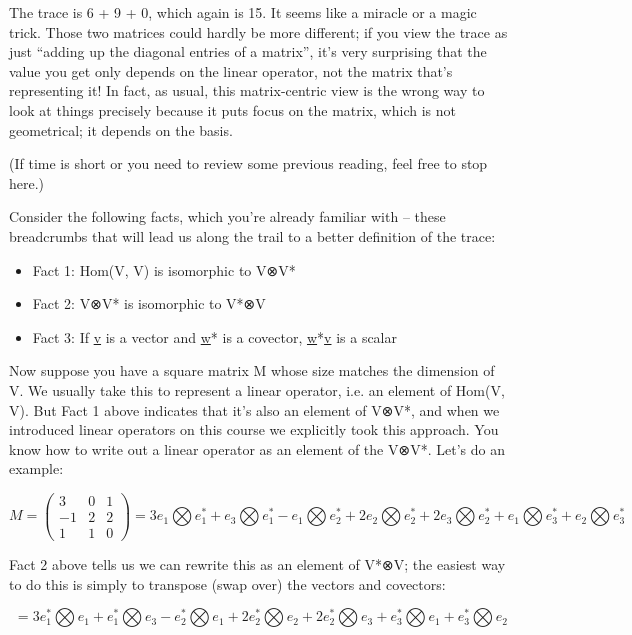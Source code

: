 \documentclass[oneside,english]{amsbook}
\numberwithin{section}{chapter}
\theoremstyle{plain}
\theoremstyle{definition}
\begin{document}
The trace is 6 + 9 + 0, which again is 15. It seems like a miracle or a
magic trick. Those two matrices could hardly be more different; if you
view the trace as just ``adding up the diagonal entries of a matrix'',
it's very surprising that the value you get only depends on the linear
operator, not the matrix that's representing it! In fact, as usual, this
matrix-centric view is the wrong way to look at things precisely because
it puts focus on the matrix, which is not geometrical; it depends on the
basis.

(If time is short or you need to review some previous reading, feel free
to stop here.)

Consider the following facts, which you're already familiar with --
these breadcrumbs that will lead us along the trail to a better
definition of the trace:

\begin{itemize}
	\item
	Fact 1: Hom(V, V) is isomorphic to V⊗V*
	\item
	Fact 2: V⊗V* is isomorphic to V*⊗V
	\item
	Fact 3: If \ul{v} is a vector and \ul{w}* is a covector, \ul{w}*\ul{v}
	is a scalar
\end{itemize}

Now suppose you have a square matrix M whose size matches the dimension
of V. We usually take this to represent a linear operator, i.e. an
element of Hom(V, V). But Fact 1 above indicates that it's also an
element of V⊗V*, and when we introduced linear operators on this course
we explicitly took this approach. You know how to write out a linear
operator as an element of the V⊗V*. Let's do an example:

\[{M = \begin{pmatrix}
		3 & 0 & 1 \\
		- 1 & 2 & 2 \\
		1 & 1 & 0
	\end{pmatrix}
}{= 3e_{1}\bigotimes e_{1}^{*} + e_{3}\bigotimes e_{1}^{*} - e_{1}\bigotimes e_{2}^{*} + 2e_{2}\bigotimes e_{2}^{*} + 2e_{3}\bigotimes e_{2}^{*} + e_{1}\bigotimes e_{3}^{*} + e_{2}\bigotimes e_{3}^{*}}\]

Fact 2 above tells us we can rewrite this as an element of V*⊗V; the
easiest way to do this is simply to transpose (swap over) the vectors
and covectors:

\[= 3e_{1}^{*}\bigotimes e_{1} + e_{1}^{*}\bigotimes e_{3} - e_{2}^{*}\bigotimes e_{1} + 2e_{2}^{*}\bigotimes e_{2} + 2e_{2}^{*}\bigotimes e_{3} + e_{3}^{*}\bigotimes e_{1} + e_{3}^{*}\bigotimes e_{2}\]
\end{document}
